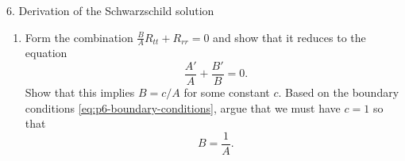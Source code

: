 \documentclass[11pt]{article}
\begin{document}
\begin{problem}{6. Derivation of the Schwarzschild solution}
\begin{enumerate}[label=(\alph*)]
\begin{answer}
\begin{equation}
\begin{aligned}
            R_{\theta\theta}
            &=\left(-\frac rB\right)'+\csc^2\theta
              -\frac rB S+\frac2B-\cot^2\theta\\
            &=-\frac{rA'}{2AB}+\frac{rB'}{2B^2}-\frac1B+1,\\
            R_{\phi\phi}
            &=\sin^2\theta\left[\left(-\frac rB\right)'
              -\frac rB S+\frac2B\right]
              +(\sin^2\theta-\cos^2\theta)-\cos^2\theta+2\cos^2\theta\\
            &=\sin^2\theta\,R_{\theta\theta}.
          \end{aligned}
        \end{equation}
        Where we have used \(\csc^2\theta-\cot^2\theta=1\).
        The off-diagonal components vanish by symmetry; time reflection \(t\mapsto-t\) forces \(R_{ti}=0\) for spatial indices \(i\).
        Spherical symmetry forces the mixed radial-angular components to vanish and the angular block to be proportional to the sphere metric, so \(R_{r\theta}=R_{r\phi}=R_{\theta\phi}=0\).
          \end{answer}
		\item Form the combination \(\frac BA R_{tt}+R_{rr}=0\) and show that it reduces to the equation
		      \begin{equation}
			      \label{eq:p6-log-derivative-relation}
			      \frac{A'}A+\frac{B'}B=0.
		      \end{equation}
		      Show that this implies \(B=c/A\) for some constant \(c\).
		      Based on the boundary conditions \cref{eq:p6-boundary-conditions}, argue that we must have \(c=1\) so that
		      \begin{equation}
			      \label{eq:p6-reciprocal-relation}
			      B=\frac1A.
		      \end{equation}


\end{enumerate}
\end{problem}
\end{document}
